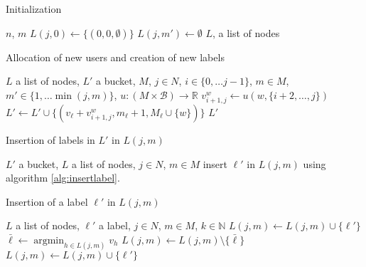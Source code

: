 \documentclass[a4paper, 10pt]{article}
\DeclareMathOperator*{\argmin}{argmin}
\begin{document}
\begin{algorithm}
    \caption{Initialization}
    \label{alg:initialization}
    \begin{algorithmic}
        \REQUIRE $n$, $m$
            \STATE $L(j, 0) \leftarrow \{ (0, 0, \emptyset) \}$
                \STATE $L(j, m') \leftarrow \emptyset$
            \ENDFOR
        \ENDFOR
    \RETURN $L$, a list of nodes
    \end{algorithmic}
\end{algorithm}

\begin{algorithm}
    \caption{Allocation of new users and creation of new labels}
    \label{alg:newusers}
    \begin{algorithmic}
        \REQUIRE $L$ a list of nodes, 
                 $L'$ a bucket,
                 $M$, 
                 $j \in N$,
                 $i \in \{0, \dots j - 1\}$,
                 $m \in M$,
                 $m' \in \{1, \dots \min(j, m)\}$,
                 $u : (M \times \mathscr{B}) \rightarrow \mathbb{R}$
                \STATE $v_{i+1, j}^w \leftarrow u(w, \{i+2, \dots, j\})$
                \STATE $L' \leftarrow L' \cup \{(v_\ell + v_{i+1, j}^w, m_\ell + 1, M_\ell \cup \{w\})\}$
            \ENDFOR
        \ENDFOR
        \RETURN $L'$
    \end{algorithmic}
\end{algorithm}

\begin{algorithm}
    \caption{Insertion of labels in $L'$ in $L(j, m)$}
    \label{alg:insertlabels}
    \begin{algorithmic}
        \REQUIRE $L'$ a bucket,
                 $L$ a list of nodes,
                 $j \in N$,
                 $m \in M$
                \STATE insert $\ell'$ in $L(j, m)$ using algorithm \ref{alg:insertlabel}.
            \ENDIF
        \ENDFOR
    \end{algorithmic}
\end{algorithm}

\begin{algorithm}
    \caption{Insertion of a label $\ell'$ in $L(j,m)$} 
    \label{alg:insertlabel}
    \begin{algorithmic}
        \REQUIRE $L$ a list of nodes,
                 $\ell'$ a label,
                 $j \in N$,
                 $m \in M$,
                 $k \in \mathbb{N}$
            \STATE $L(j, m) \leftarrow L(j, m) \cup \{ \ell' \}$
        \ELSE
            \STATE $\bar{\ell} \leftarrow \argmin_{h \in L(j, m)}v_h$
                \STATE $L(j,m) \leftarrow L(j,m) \setminus \{ \bar{\ell} \}$
                \STATE $L(j,m) \leftarrow L(j,m) \cup      \{ \ell' \}$
            \ENDIF
        \ENDIF
    \end{algorithmic}
\end{algorithm}
\end{document}
